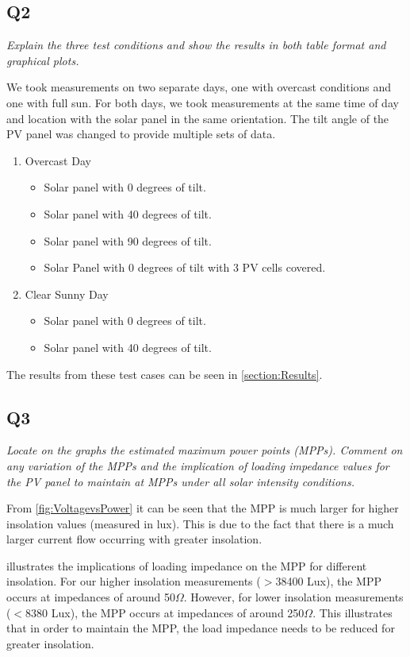 \documentclass{article}
\begin{document}
	\newpage
	\subsection{Q2}
		\textit{Explain the three test conditions and show the results in both table format and graphical plots.}
		
		
		We took measurements on two separate days, one with overcast conditions and one with full sun. For both days, we took measurements at the same time of day and location with the solar panel in the same orientation. The tilt angle of the PV panel was changed to provide multiple sets of data.
		
		\begin{enumerate}
			\item Overcast Day
			\begin{itemize}
				\item Solar panel with 0 degrees of tilt.
				\item Solar panel with 40 degrees of tilt.
				\item Solar panel with 90 degrees of tilt.
				\item Solar Panel with 0 degrees of tilt with 3 PV cells covered.
			\end{itemize}
			\item Clear Sunny Day
			\begin{itemize}
				\item Solar panel with 0 degrees of tilt.
				\item Solar panel with 40 degrees of tilt.
			\end{itemize}
		\end{enumerate}	
	
	The results from these test cases can be seen in \cref{section:Results}.
	
	\subsection{Q3}
		\textit{Locate on the graphs the estimated maximum power points (MPPs). Comment on any variation of the MPPs and the implication of loading impedance values for the PV panel to maintain at MPPs under all solar intensity conditions.}
		
		From \cref{fig:VoltagevsPower} it can be seen that the MPP is much larger for higher insolation values (measured in lux). This is due to the fact that there is a much larger current flow occurring with greater insolation.
		
		 illustrates the implications of loading impedance on the MPP for different insolation. For our higher insolation measurements ($>$38400 Lux), the MPP occurs at impedances of around 50$ \Omega $. However, for lower insolation measurements ($<$8380 Lux), the MPP occurs at impedances of around 250$ \Omega $. This illustrates that in order to maintain the MPP, the load impedance needs to be reduced for greater insolation.
	
\end{document}
